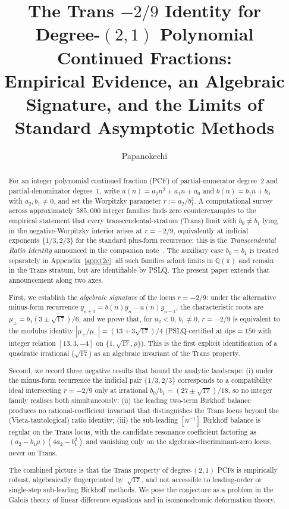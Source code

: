 \documentclass[11pt]{amsart}
\title[The Trans $-2/9$ Identity]{The Trans $-2/9$ Identity for
Degree-$(2,1)$ Polynomial Continued Fractions:\\
Empirical Evidence, an Algebraic Signature, and the Limits of
Standard Asymptotic Methods}
\author{Papanokechi}
\theoremstyle{definition}
\theoremstyle{remark}
\newcommand{\dps}{\mathrm{dps}}
\begin{document}
\begin{abstract}
For an integer polynomial continued fraction (PCF) of partial-numerator
degree~$2$ and partial-denominator degree~$1$, write
$a(n) = a_2 n^2 + a_1 n + a_0$ and $b(n) = b_1 n + b_0$ with
$a_2,b_1\ne 0$, and set the Worpitzky parameter $r := a_2/b_1^2$.
A computational survey across approximately $585{,}000$ integer
families finds zero counterexamples to the empirical statement that
every transcendental-stratum (Trans) limit with $b_0\ne b_1$ lying
in the negative-Worpitzky interior arises at $r = -2/9$,
equivalently at indicial exponents $\{1/3,2/3\}$ for the standard
plus-form recurrence; this is the
\emph{Transcendental Ratio Identity} announced in the companion
note~\cite{TRINote}.  The auxiliary case $b_0 = b_1$ is treated
separately in Appendix~\ref{app:t2c}: all such families admit
limits in $\mathbb{Q}(\pi)$ and remain in the Trans stratum, but
are identifiable by PSLQ.  The present paper extends that announcement
along two axes.

First, we establish the \emph{algebraic signature} of the locus
$r=-2/9$: under the alternative minus-form recurrence
$y_{n+1} = b(n)y_n - a(n)y_{n-1}$, the characteristic roots are
$\mu_\pm = b_1(3\pm\sqrt{17})/6$, and we prove that, for $a_2<0$,
$b_1\ne 0$, $r=-2/9$ is equivalent to the modulus identity
$|\mu_+/\mu_-| = (13+3\sqrt{17})/4$ (PSLQ-certified at $\dps=150$
with integer relation $[13,3,-4]$ on $\{1,\sqrt{17},\rho\}$).  This
is the first explicit identification of a quadratic irrational
($\sqrt{17}$) as an algebraic invariant of the Trans property.

Second, we record three negative results that bound the
analytic landscape: (i) under the minus-form recurrence the
indicial pair $\{1/3,2/3\}$ corresponds to a compatibility ideal
intersecting $r=-2/9$ only at irrational $b_0/b_1=(27\pm\sqrt{17})/18$,
so no integer family realises both simultaneously; (ii) the leading
two-term Birkhoff balance produces no rational-coefficient invariant
that distinguishes the Trans locus beyond the (Vieta-tautological)
ratio identity; (iii) the sub-leading $[n^{-1}]$ Birkhoff balance is
regular on the Trans locus, with the candidate resonance coefficient
factoring as $(a_2-b_1\mu)(4a_2-b_1^2)$ and vanishing only on the
algebraic-discriminant-zero locus, never on Trans.

The combined picture is that the Trans property of degree-$(2,1)$ PCFs
is empirically robust, algebraically fingerprinted by~$\sqrt{17}$, and
not accessible to leading-order or single-step sub-leading Birkhoff
methods.  We pose the conjecture as a problem in the Galois theory of
linear difference equations and in isomonodromic deformation theory.
\end{abstract}
\end{document}
